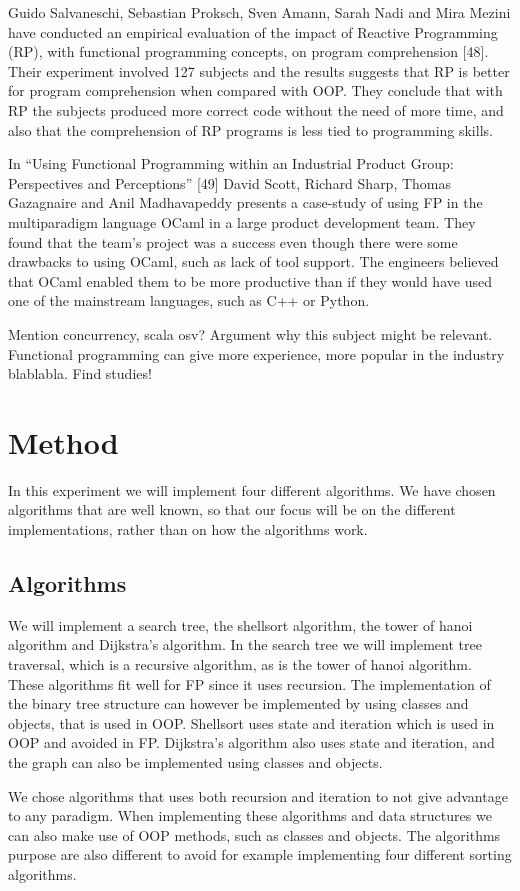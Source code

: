 \documentclass {article}
\begin{document}
Guido Salvaneschi, Sebastian Proksch, Sven Amann, Sarah Nadi and Mira Mezini have conducted an empirical evaluation of the impact of Reactive Programming (RP), with functional programming concepts, on program comprehension [48]. Their experiment involved 127 subjects and the results suggests that RP is better for program comprehension when compared with OOP. They conclude that with RP the subjects produced more correct code without the need of more time, and also that the comprehension of RP programs is less tied to programming skills. 

In “Using Functional Programming within an Industrial Product Group: Perspectives and Perceptions” [49] David Scott, Richard Sharp, Thomas Gazagnaire and Anil Madhavapeddy presents a case-study of using FP in the multiparadigm language OCaml in a large product development team. They found that the team’s project was a success even though there were some drawbacks to using OCaml, such as lack of tool support. The engineers believed that OCaml enabled them to be more productive than if they would have used one of the mainstream languages, such as C++ or Python.

Mention concurrency, scala osv? Argument why this subject might be relevant. Functional programming can give more experience, more popular in the industry blablabla. Find studies!
\section{Method}
In this experiment we will implement four different algorithms. We have chosen algorithms that are well known, so that our focus will be on the different implementations, rather than on how the algorithms work. 
\subsection{Algorithms}
We will implement a search tree, the shellsort algorithm, the tower of hanoi algorithm and Dijkstra’s algorithm. In the search tree we will implement tree traversal, which is a recursive algorithm, as is the tower of hanoi algorithm. These algorithms fit well for FP since it uses recursion. The implementation of the binary tree structure can however be implemented by using classes and objects, that is used in OOP. Shellsort uses state and iteration which is used in OOP and avoided in FP. Dijkstra’s algorithm also uses state and iteration, and the graph can also be implemented using classes and objects.

We chose algorithms that uses both recursion and iteration to not give advantage to any paradigm. When implementing these algorithms and data structures we can also make use of OOP methods, such as classes and objects. The algorithms purpose are also different to avoid for example implementing four different sorting algorithms. 
\end{document}
